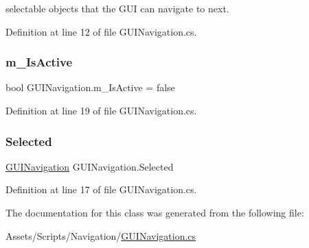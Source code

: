 selectable objects that the G\+UI can navigate to next. 



Definition at line 12 of file G\+U\+I\+Navigation.\+cs.

\mbox{\label{class_g_u_i_navigation_a1336705311b4ab26bb121b6d81d6a090}} 
\subsubsection{\texorpdfstring{m\+\_\+\+Is\+Active}{m\_IsActive}}
{\footnotesize\ttfamily bool G\+U\+I\+Navigation.\+m\+\_\+\+Is\+Active = false\hspace{0.3cm}{\ttfamily [protected]}}



Definition at line 19 of file G\+U\+I\+Navigation.\+cs.

\mbox{\label{class_g_u_i_navigation_ae0698cb4125a3d26d4e3fe20ae9cbbbf}} 
\subsubsection{\texorpdfstring{Selected}{Selected}}
{\footnotesize\ttfamily \mbox{\hyperlink{class_g_u_i_navigation}{G\+U\+I\+Navigation}} G\+U\+I\+Navigation.\+Selected\hspace{0.3cm}{\ttfamily [static]}}



Definition at line 17 of file G\+U\+I\+Navigation.\+cs.



The documentation for this class was generated from the following file\+:\begin{DoxyCompactItemize}
\item 
Assets/\+Scripts/\+Navigation/\mbox{\hyperlink{_g_u_i_navigation_8cs}{G\+U\+I\+Navigation.\+cs}}\end{DoxyCompactItemize}
